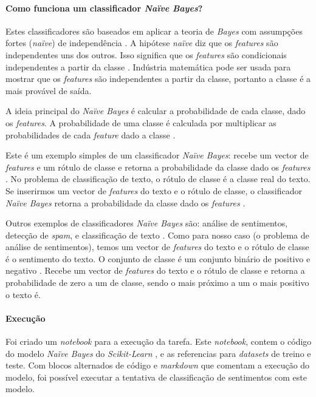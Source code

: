 \paragraph{Como funciona um classificador \textit{Naïve Bayes}?\\}

Estes classificadores são baseados em aplicar a teoria de \textit{Bayes} com assumpções fortes (\textit{naïve}) de independência \cite{mbn1}. A hipótese \textit{naïve} diz que os \textit{features} são independentes uns dos outros. Isso significa que os \textit{features} são condicionais independentes a partir da classe \cite{gfg2}. Indústria matemática pode ser usada para mostrar que os \textit{features} são independentes a partir da classe, portanto a classe é a mais provável de saída.

A ideia principal do \textit{Naïve Bayes} é calcular a probabilidade de cada classe, dado os \textit{features}. A probabilidade de uma classe é calculada por multiplicar as probabilidades de cada \textit{feature} dado a classe \cite{mbn1}.

Este é um exemplo simples de um classificador \textit{Naïve Bayes}: recebe um vector de \textit{features} e um rótulo de classe e retorna a probabilidade da classe dado os \textit{features} \cite{skl1}. No problema de classificação de texto, o rótulo de classe é a classe real do texto. Se inserirmos um vector de \textit{features} do texto e o rótulo de classe, o classificador \textit{Naïve Bayes} retorna a probabilidade da classe dado os \textit{features} \cite{gfg2}.

Outros exemplos de classificadores \textit{Naïve Bayes} são: análise de sentimentos, detecção de \textit{spam}, e classificação de texto \cite{mbn1}. Como para nosso caso (o problema de análise de sentimentos), temos um vector de \textit{features} do texto e o rótulo de classe é o sentimento do texto. O conjunto de classe é um conjunto binário de positivo e negativo \cite{gfg2}. Recebe um vector de \textit{features} \cite{skl1} do texto e o rótulo de classe e retorna a probabilidade de zero a um de classe, sendo o mais próximo a um o mais positivo o texto é.

\paragraph{Execução\\}

Foi criado um \textit{notebook} para a execução da tarefa. Este \textit{notebook}, contem o código do modelo \textit{Naïve Bayes} do \textit{Scikit-Learn} \cite{skl1}, e as referencias para \textit{datasets} de treino e teste. Com blocos alternados de código e \textit{markdown} que comentam a execução do modelo, foi possível executar a tentativa de classificação de sentimentos com este modelo.

